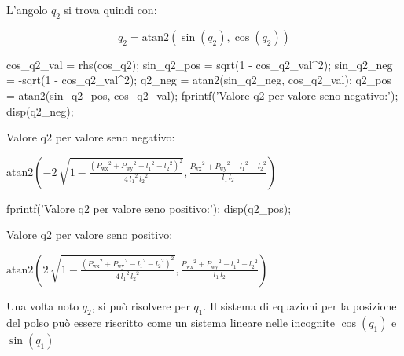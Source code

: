 \documentclass[11pt, a4paper]{article}
\begin{document}
\begin{par}
\begin{flushleft}
L'angolo $q_2$ si trova quindi con:
\end{flushleft}
\end{par}

\[
    q_2 = \textrm{atan2}(\sin(q_2), \cos(q_2))
\]


\begin{matlabcode}
cos_q2_val = rhs(cos_q2);
sin_q2_pos = sqrt(1 - cos_q2_val^2);
sin_q2_neg = -sqrt(1 - cos_q2_val^2);
q2_neg = atan2(sin_q2_neg, cos_q2_val);
q2_pos = atan2(sin_q2_pos, cos_q2_val);
fprintf('Valore q2 per valore seno negativo:\n');
disp(q2_neg);
\end{matlabcode}
\begin{matlaboutput}
Valore q2 per valore seno negativo:
\end{matlaboutput}
\begin{matlabsymbolicoutput}
$\displaystyle \textrm{atan2}\left(-2\,\sqrt{1-\frac{{{\left({P_{\textrm{wx}} }^2 +{P_{\textrm{wy}} }^2 -{l_1 }^2 -{l_2 }^2 \right)}}^2 }{4\,{l_1 }^2 \,{l_2 }^2 }},\frac{{P_{\textrm{wx}} }^2 +{P_{\textrm{wy}} }^2 -{l_1 }^2 -{l_2 }^2 }{l_1 \,l_2 }\right)$
\end{matlabsymbolicoutput}
\begin{matlabcode}
fprintf('Valore q2 per valore seno positivo:\n');
disp(q2_pos);
\end{matlabcode}
\begin{matlaboutput}
Valore q2 per valore seno positivo:
\end{matlaboutput}
\begin{matlabsymbolicoutput}
$\displaystyle \textrm{atan2}\left(2\,\sqrt{1-\frac{{{\left({P_{\textrm{wx}} }^2 +{P_{\textrm{wy}} }^2 -{l_1 }^2 -{l_2 }^2 \right)}}^2 }{4\,{l_1 }^2 \,{l_2 }^2 }},\frac{{P_{\textrm{wx}} }^2 +{P_{\textrm{wy}} }^2 -{l_1 }^2 -{l_2 }^2 }{l_1 \,l_2 }\right)$
\end{matlabsymbolicoutput}


\begin{par}
\begin{flushleft}
Una volta noto $q_2$, si può risolvere per $q_1$. Il sistema di equazioni per la posizione del polso può essere riscritto come un sistema lineare nelle incognite $\cos (q_1 )$ e $\sin (q_1 )$
\end{flushleft}
\end{par}
\end{document}
